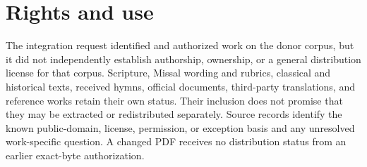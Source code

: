 \section{Rights and use}

The integration request identified and authorized work on the donor corpus,
but it did not independently establish authorship, ownership, or a general
distribution license for that corpus. Scripture, Missal wording and rubrics,
classical and historical texts, received hymns, official documents,
third-party translations, and reference works retain their own status. Their
inclusion does not promise that they may be extracted or redistributed
separately. Source records identify the known public-domain, license,
permission, or exception basis and any unresolved work-specific question. A
changed PDF receives no distribution status from an earlier exact-byte
authorization.
